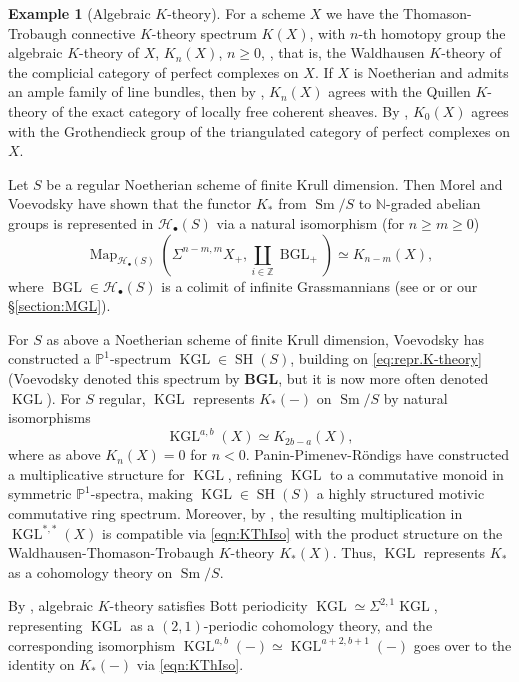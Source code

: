 \documentclass[10pt]{amsart}
\theoremstyle{definition}
\newtheorem{exmp}[defn]{Example}
\theoremstyle{plain}
\numberwithin{equation}{section}
\newcommand{\0}{\emptyset}
\newcommand{\sH}{{\mathcal H}}
\newcommand{\N}{{\mathbb N}}
\renewcommand{\P}{{\mathbb P}}
\newcommand{\Z}{{\mathbb Z}}
\newcommand{\KGL}{{\operatorname{KGL}}}
\newcommand{\BGL}{{\operatorname{BGL}}}
\newcommand{\SH}{{\operatorname{SH}}}
\newcommand{\Sm}{{\operatorname{Sm}}}
\newcommand{\Map}{{\operatorname{Map}}}
\begin{document}
\begin{exmp}[Algebraic $K$-theory]
\label{exmp:KGL}
For a scheme $X$ we have the Thomason-Trobaugh connective $K$-theory spectrum $K(X)$, with $n$-th homotopy group the algebraic $K$-theory of $X$, $K_n(X)$, $n\ge0$, \cite[Definition 3.1]{Thomason:K-theory}, that is, the Waldhausen $K$-theory of the complicial category of perfect complexes on $X$. If $X$ is Noetherian and admits an ample family of line bundles, then by \cite[Exercise 5.7]{Thomason:K-theory}, $K_n(X)$ agrees with the Quillen $K$-theory of the exact category of  locally free coherent sheaves. By \cite[3.1.1]{Thomason:K-theory}, $K_0(X)$ agrees with the Grothendieck group of the triangulated category of perfect complexes on $X$. 

Let $S$ be a regular Noetherian scheme of finite Krull dimension. Then Morel and Voevodsky \cite[\S 4 Theorem 3.13]{morvoe:homotopytheory} have shown that the functor $K_*$ from $\Sm/S$ to $\N$-graded abelian groups is represented in $\sH_\bullet(S)$ via a natural isomorphism (for $n\ge m\ge0$)
 \begin{equation}
    \label{eq:repr.K-theory}
        \Map_{\sH_\bullet(S)}(\Sigma^{n-m,m}X_+, \coprod_{i \in \Z}\BGL_+)\simeq K_{n-m}(X),
    \end{equation}
where $\BGL \in \sH_{\bullet}(S)$ is a colimit of infinite Grassmannians (see \cite[Section 6.2]{voe:homotopy_theory} or \cite[\S4 Section 4.3]{morvoe:homotopytheory} or our \S \ref{section:MGL}). 
 
 For $S$ as above a Noetherian scheme of finite Krull dimension, Voevodsky \cite[Section 6.2]{voe:homotopy_theory} has constructed 
a $\P^1$-spectrum $\KGL \in \SH(S)$, building on \eqref{eq:repr.K-theory} (Voevodsky denoted 
 this spectrum by $\mathbf{BGL}$, but it is now more often denoted $\KGL$). For $S$ regular,  $\KGL$ represents $K_*(-)$ on $\Sm/S$ by natural isomorphisms
 \begin{equation}\label{eqn:KThIso}
 \KGL^{a,b}(X)\simeq K_{2b-a}(X),
 \end{equation}
 where as above  $K_n(X)=0$ for $n<0$. Panin-Pimenev-R\"ondigs \cite{PPR} have constructed a multiplicative structure for $\KGL$, refining $\KGL$ to a commutative monoid in symmetric $\P^1$-spectra, making $\KGL\in \SH(S)$ a highly structured motivic commutative ring spectrum. Moreover, by \cite[Corollary 2.2.4]{PPR}, the resulting  multiplication in $\KGL^{*,*}(X)$ is compatible via \eqref{eqn:KThIso} with the product structure on the Waldhausen-Thomason-Trobaugh $K$-theory $K_*(X)$. Thus, $\KGL$ represents $K_*$ as a cohomology theory on $\Sm/S$.
 
By \cite[Theorem 6.8]{voe:homotopy_theory}, algebraic $K$-theory satisfies Bott periodicity $\KGL \simeq \Sigma^{2,1}\KGL$, representing $\KGL$ as a $(2,1)$-periodic cohomology theory, and the corresponding isomorphism  $ \KGL^{a,b}(-)\simeq  \KGL^{a+2,b+1}(-)$ goes over to the identity on $K_*(-)$ via \eqref{eqn:KThIso}.
\end{exmp}
\end{document}
